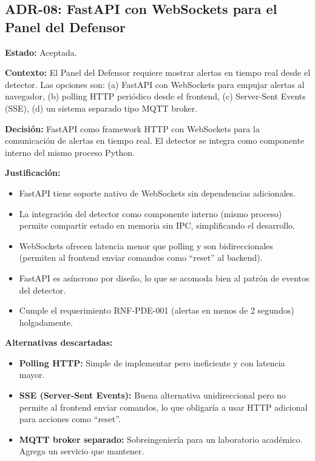 \documentclass[11pt,a4paper]{article}
\begin{document}
\subsection{ADR-08: FastAPI con WebSockets para el Panel del Defensor}

\textbf{Estado:} Aceptada.

\textbf{Contexto:} El Panel del Defensor requiere mostrar alertas en
tiempo real desde el detector. Las opciones son: (a) FastAPI con
WebSockets para empujar alertas al navegador, (b) polling HTTP
periódico desde el frontend, (c) Server-Sent Events (SSE), (d) un
sistema separado tipo MQTT broker.

\textbf{Decisión:} FastAPI como framework HTTP con WebSockets para la
comunicación de alertas en tiempo real. El detector se integra como
componente interno del mismo proceso Python.

\textbf{Justificación:}

\begin{itemize}
  \item FastAPI tiene soporte nativo de WebSockets sin dependencias
    adicionales.
  \item La integración del detector como componente interno (mismo
    proceso) permite compartir estado en memoria sin IPC, simplificando
    el desarrollo.
  \item WebSockets ofrecen latencia menor que polling y son
    bidireccionales (permiten al frontend enviar comandos como
    ``reset'' al backend).
  \item FastAPI es asíncrono por diseño, lo que se acomoda bien al
    patrón de eventos del detector.
  \item Cumple el requerimiento RNF-PDE-001 (alertas en menos de 2
    segundos) holgadamente.
\end{itemize}

\textbf{Alternativas descartadas:}

\begin{itemize}
  \item \textbf{Polling HTTP:} Simple de implementar pero ineficiente y
    con latencia mayor.
  \item \textbf{SSE (Server-Sent Events):} Buena alternativa
    unidireccional pero no permite al frontend enviar comandos, lo que
    obligaría a usar HTTP adicional para acciones como ``reset''.
  \item \textbf{MQTT broker separado:} Sobreingeniería para un
    laboratorio académico. Agrega un servicio que mantener.
\end{itemize}
\end{document}
